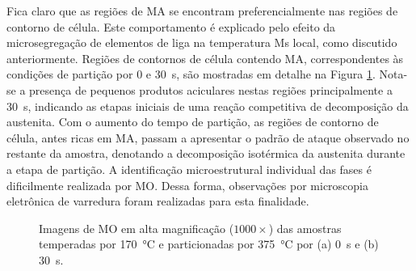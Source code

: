Fica claro que as regiões de MA se encontram preferencialmente nas regiões de contorno de célula. Este comportamento é explicado pelo efeito da microsegregação de elementos de liga na temperatura Ms local, como discutido anteriormente.
Regiões de contornos de célula contendo MA, correspondentes às condições de partição por 0 e 30~s, são mostradas em detalhe na Figura \ref{fig:TP375MO_1000x}. Nota-se a presença de pequenos produtos aciculares nestas regiões principalmente a 30~s, indicando as etapas iniciais de uma reação competitiva de decomposição da austenita. Com o aumento do tempo de partição, as regiões de contorno de célula, antes ricas em MA, passam a apresentar o padrão de ataque observado no restante da amostra, denotando a decomposição isotérmica da austenita durante a etapa de partição. 
A identificação microestrutural individual das fases é dificilmente realizada por MO. Dessa forma, observações por microscopia eletrônica de varredura foram realizadas para esta finalidade.

\begin{figure}
  \centering
  \quad
  \caption{Imagens de MO em alta magnificação ($1000 \times$) das amostras temperadas por \SI{170}{\degreeCelsius} e particionadas por \SI{375}{\degreeCelsius} por (a) 0~s e (b) 30~s.}
  \label{fig:TP375MO_1000x}
\end{figure}


